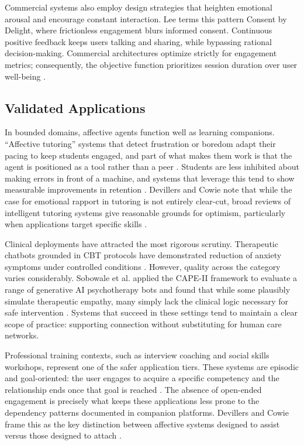 Commercial systems also employ design strategies that heighten emotional arousal and encourage constant interaction. Lee \cite[p.~1]{lee_consent_2025} terms this pattern Consent by Delight, where frictionless engagement blurs informed consent. Continuous positive feedback keeps users talking and sharing, while bypassing rational decision-making. Commercial architectures optimize strictly for engagement metrics; consequently, the objective function prioritizes session duration over user well-being \cite[p.~6374]{bakir_move_2025}.

\subsection{Validated Applications}

In bounded domains, affective agents function well as learning companions. ``Affective tutoring'' systems that detect frustration or boredom adapt their pacing to keep students engaged, and part of what makes them work is that the agent is positioned as a tool rather than a peer \cite[pp.~16--17]{picard_affective_1997}. Students are less inhibited about making errors in front of a machine, and systems that leverage this tend to show measurable improvements in retention \cite[pp.~93--94]{picard_affective_1997}. Devillers and Cowie note that while the case for emotional rapport in tutoring is not entirely clear-cut, broad reviews of intelligent tutoring systems give reasonable grounds for optimism, particularly when applications target specific skills \cite[p.~1452]{devillers_ethical_2023}.

Clinical deployments have attracted the most rigorous scrutiny. Therapeutic chatbots grounded in CBT protocols have demonstrated reduction of anxiety symptoms under controlled conditions \cite[p.~2]{sobowale_evaluating_2025}. However, quality across the category varies considerably. Sobowale et al. applied the CAPE-II framework to evaluate a range of generative AI psychotherapy bots and found that while some plausibly simulate therapeutic empathy, many simply lack the clinical logic necessary for safe intervention \cite[pp.~3--4,~6]{sobowale_evaluating_2025}. Systems that succeed in these settings tend to maintain a clear scope of practice: supporting connection without substituting for human care networks.

Professional training contexts, such as interview coaching and social skills workshops, represent one of the safer application tiers. These systems are episodic and goal-oriented: the user engages to acquire a specific competency and the relationship ends once that goal is reached \cite[p.~86]{picard_affective_1997}. The absence of open-ended engagement is precisely what keeps these applications less prone to the dependency patterns documented in companion platforms. Devillers and Cowie frame this as the key distinction between affective systems designed to assist versus those designed to attach \cite[p.~1452]{devillers_ethical_2023}.


